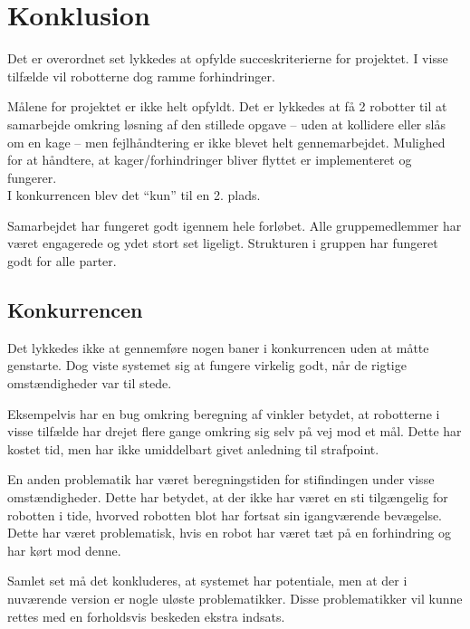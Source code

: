 \chapter{Konklusion}
Det er overordnet set lykkedes at opfylde succeskriterierne for projektet. I visse tilfælde vil robotterne dog ramme forhindringer.

Målene for projektet er ikke helt opfyldt. Det er lykkedes at få 2 robotter til at samarbejde omkring løsning af den stillede opgave -- uden at kollidere eller slås om en kage -- men fejlhåndtering er ikke blevet helt gennemarbejdet. Mulighed for at håndtere, at kager/forhindringer bliver flyttet er implementeret og fungerer.\\
I konkurrencen blev det "`kun"' til en 2. plads.

Samarbejdet har fungeret godt igennem hele forløbet. Alle gruppemedlemmer har været engagerede og ydet stort set ligeligt. Strukturen i gruppen har fungeret godt for alle parter.

\section{Konkurrencen}
Det lykkedes ikke at gennemføre nogen baner i konkurrencen uden at måtte genstarte. Dog viste systemet sig at fungere virkelig godt, når de rigtige omstændigheder var til stede.

Eksempelvis har en bug omkring beregning af vinkler betydet, at robotterne i visse tilfælde har drejet flere gange omkring sig selv på vej mod et mål. Dette har kostet tid, men har ikke umiddelbart givet anledning til strafpoint.

En anden problematik har været beregningstiden for stifindingen under visse omstændigheder. Dette har betydet, at der ikke har været en sti tilgængelig for robotten i tide, hvorved robotten blot har fortsat sin igangværende bevægelse. Dette har været problematisk, hvis en robot har været tæt på en forhindring og har kørt mod denne.

Samlet set må det konkluderes, at systemet har potentiale, men at der i nuværende version er nogle uløste problematikker. Disse problematikker vil kunne rettes med en forholdsvis beskeden ekstra indsats.